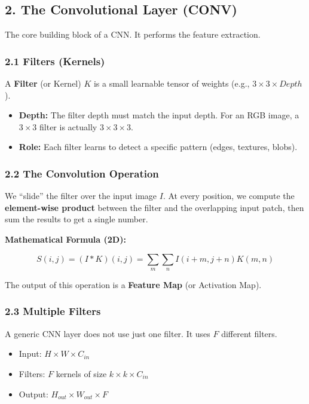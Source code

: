 \documentclass[
  italian,
  11pt,
]{article}
\begin{document}
\subsection{2. The Convolutional Layer
(CONV)}\label{the-convolutional-layer-conv}

The core building block of a CNN. It performs the feature extraction.

\subsubsection{2.1 Filters (Kernels)}\label{filters-kernels}

A \textbf{Filter} (or Kernel) \(K\) is a small learnable tensor of
weights (e.g., \(3 \times 3 \times Depth\)).

\begin{itemize}
\item
  \textbf{Depth:} The filter depth must match the input depth. For an
  RGB image, a \(3 \times 3\) filter is actually
  \(3 \times 3 \times 3\).
\item
  \textbf{Role:} Each filter learns to detect a specific pattern (edges,
  textures, blobs).
\end{itemize}

\subsubsection{2.2 The Convolution
Operation}\label{the-convolution-operation}

We ``slide'' the filter over the input image \(I\). At every position,
we compute the \textbf{element-wise product} between the filter and the
overlapping input patch, then sum the results to get a single number.

\textbf{Mathematical Formula (2D):}

\[S(i, j) = (I * K)(i, j) = \sum_{m} \sum_{n} I(i+m, j+n) K(m, n)\]

The output of this operation is a \textbf{Feature Map} (or Activation
Map).

\subsubsection{2.3 Multiple Filters}\label{multiple-filters}

A generic CNN layer does not use just one filter. It uses \(F\)
different filters.

\begin{itemize}
\item
  Input: \(H \times W \times C_{in}\)
\item
  Filters: \(F\) kernels of size \(k \times k \times C_{in}\)
\item
  Output: \(H_{out} \times W_{out} \times F\)
\end{itemize}
\end{document}
